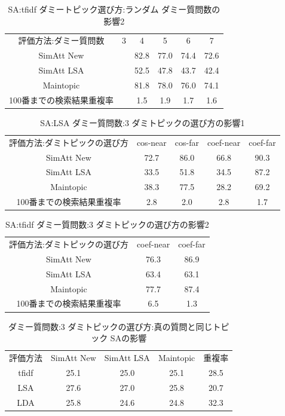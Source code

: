 \documentclass[master]{suribt}
\theoremstyle{definition}
\begin{document}
 \begin{table}[!hbp]
 \center
 \begin{tabular}{|c|c|c|c|c|c|}
 \hline
 評価方法:ダミー質問数  & 3 & 4 & 5 & 6 & 7    \\
 SimAtt New &  & 82.8 & 77.0 & 74.4 & 72.6 \\
 SimAtt LSA &  & 52.5 & 47.8 & 43.7 & 42.4 \\
 Maintopic &  & 81.8 & 78.0 & 76.0 & 74.1 \\
 100番までの検索結果重複率 &  & 1.5 & 1.9 & 1.7 & 1.6 \\
 \hline
 \end{tabular}
 \caption{SA:tfidf ダミートピック選び方:ランダム ダミー質問数の影響2}
 \end{table}

 \begin{table}[!hbp]
 \center
 \begin{tabular}{|c|c|c|c|c|}
 \hline
 評価方法:ダミトピックの選び方 & cos-near & cos-far & coef-near & coef-far \\
 SimAtt New & 72.7 & 86.0 & 66.8 & 90.3 \\
 SimAtt LSA & 33.5 & 51.8 & 34.5 & 87.2 \\
 Maintopic &  38.3 & 77.5 & 28.2 & 69.2 \\
 100番までの検索結果重複率 & 2.8 & 2.0 & 2.8 & 1.7 \\
 \hline
 \end{tabular}
 \caption{SA:LSA ダミー質問数:3  ダミトピックの選び方の影響1}
 \end{table}

 \begin{table}[!hbp]
 \center
 \begin{tabular}{|c|c|c|}
 \hline
 評価方法:ダミトピックの選び方 & coef-near & coef-far \\
 SimAtt New & 76.3 & 86.9 \\
 SimAtt LSA & 63.4 & 63.1 \\
 Maintopic  & 77.7 & 87.4 \\
 100番までの検索結果重複率 & 6.5 & 1.3 \\
 \hline
 \end{tabular}
 \caption{SA:tfidf ダミー質問数:3  ダミトピックの選び方の影響2}
 \end{table}

 \begin{table}[!hbp]
 \center
 \begin{tabular}{|c|c|c|c|c|}
 \hline
 評価方法  & SimAtt New & SimAtt LSA  & Maintopic & 重複率  \\
 tfidf  & 25.1 & 25.0 & 25.1 & 28.5 \\
 LSA  & 27.6 & 27.0 & 25.8 & 20.7 \\
 LDA  & 25.8 & 24.6 & 24.8 & 32.3 \\
 \hline
 \end{tabular}
 \caption{ダミー質問数:3  ダミトピックの選び方:真の質問と同じトピック SAの影響}
 \end{table}
\end{document}

